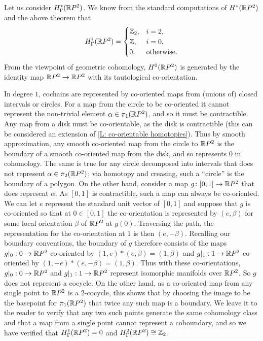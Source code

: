 \begin{example}
	Let us consider $H^*_\Gamma(\mathbb{R} P^2)$.
	We know from the standard computations of $H^*(\mathbb{R} P^2)$ and the above theorem that
	\begin{equation*}
		H_\Gamma^i(\mathbb{R} P^2) =
		\begin{cases}
			\mathbb{Z}_2,&i = 2,\\
			\mathbb{Z},&i = 0,\\
			0,&\text{otherwise.}
		\end{cases}
	\end{equation*}
	From the viewpoint of geometric cohomology, $H^0(\mathbb{R} P^2)$ is generated by the identity map $\mathbb{R} P^2 \to \mathbb{R} P^2$ with its tautological co-orientation.

	In degree $1$, cochains are represented by co-oriented maps from (unions of) closed intervals or circles.
	For a map from the circle to be co-oriented it cannot represent the non-trivial element $\alpha \in \pi_1(\mathbb{R} P^2)$, and so it must be contractible.
	Any map from a disk must be co-orientable, as the disk is contractible (this can be considered an extension of \cref{L: co-orientable homotopies}).
	Thus by smooth approximation, any smooth co-oriented map from the circle to $\mathbb{R} P^2$ is the boundary of a smooth co-oriented map from the disk, and so represents $0$ in cohomology.
	The same is true for any circle decomposed into intervals that does not represent $\alpha \in \pi_2(\mathbb{R} P^2)$; via homotopy and creasing, such a ``circle'' is the boundary of a polygon.
	On the other hand, consider a map $g \colon [0,1] \to \mathbb{R} P^2$ that does represent $\alpha$.
	As $[0,1]$ is contractible, such a map can always be co-oriented.
	We can let $e$ represent the standard unit vector of $[0,1]$ and suppose that $g$ is co-oriented so that at $0 \in [0,1]$ the co-orientation is represented by $(e,\beta)$ for some local orientation $\beta$ of $\mathbb{R} P^2$ at $g(0)$.
	Traversing the path, the representation for the co-orientation at $1$ is then $(e,-\beta)$.
	Recalling our boundary conventions, the boundary of $g$ therefore consists of the maps $g|_0:0 \to \mathbb{R} P^2$ co-oriented by $(1,e)*(e,\beta) = (1,\beta)$ and $g|_1:1 \to \mathbb{R} P^2$ co-oriented by $(1,-e)*(e,-\beta) = (1,\beta)$.
	Thus with these co-orientations, $g|_0:0 \to \mathbb{R} P^2$ and $g|_1:1 \to \mathbb{R} P^2$ represent isomorphic manifolds over $\mathbb{R} P^2$.
	So $g$ does not represent a cocycle.
	On the other hand, as a co-oriented map from any single point to $\mathbb{R} P^2$ is a $2$-cocycle, this shows that by choosing the image to be the basepoint for $\pi_1(\mathbb{R} P^2)$ that twice any such map is a boundary.
	We leave it to the reader to verify that any two such points generate the same cohomology class and that a map from a single point cannot represent a coboundary, and so we have verified that $H^1_\Gamma(\mathbb{R} P^2) = 0$ and $H_\Gamma^2(\mathbb{R} P^2) \cong \mathbb{Z}_2$.
\end{example}

